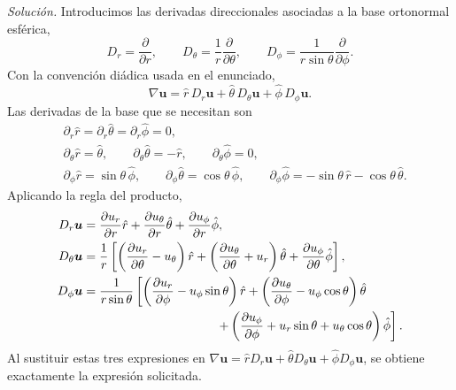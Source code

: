 \documentclass[12pt]{article}
\begin{document}
\textit{Solución.} Introducimos las derivadas direccionales asociadas a la base ortonormal esférica,
\begin{equation}
D_r=\frac{\partial}{\partial r},\qquad
D_\theta=\frac1r\frac{\partial}{\partial\theta},\qquad
D_\phi=\frac{1}{r\sin\theta}\frac{\partial}{\partial\phi}.
\end{equation}
Con la convención diádica usada en el enunciado,
\begin{equation}
\nabla\bm u=\hat r\,D_r\bm u+\hat\theta\,D_\theta\bm u+\hat\phi\,D_\phi\bm u.
\end{equation}
Las derivadas de la base que se necesitan son
\begin{align}
&\partial_r\hat r=\partial_r\hat\theta=\partial_r\hat\phi=0,\\
&\partial_\theta\hat r=\hat\theta,\qquad
\partial_\theta\hat\theta=-\hat r,\qquad
\partial_\theta\hat\phi=0,\\
&\partial_\phi\hat r=\sin\theta\,\hat\phi,\qquad
\partial_\phi\hat\theta=\cos\theta\,\hat\phi,\qquad
\partial_\phi\hat\phi=-\sin\theta\,\hat r-\cos\theta\,\hat\theta.
\end{align}
Aplicando la regla del producto,
\begin{align}
D_r\bm u={}&
\frac{\partial u_r}{\partial r}\hat r
+\frac{\partial u_\theta}{\partial r}\hat\theta
+\frac{\partial u_\phi}{\partial r}\hat\phi,\\
D_\theta\bm u={}&\frac1r\left[
\left(\frac{\partial u_r}{\partial\theta}-u_\theta\right)\hat r
+\left(\frac{\partial u_\theta}{\partial\theta}+u_r\right)\hat\theta
+\frac{\partial u_\phi}{\partial\theta}\hat\phi\right],\\
D_\phi\bm u={}&\frac{1}{r\sin\theta}\left[
\left(\frac{\partial u_r}{\partial\phi}-u_\phi\sin\theta\right)\hat r
+\left(\frac{\partial u_\theta}{\partial\phi}-u_\phi\cos\theta\right)\hat\theta\right.\\
&\left.\hspace{3.3cm}+\left(\frac{\partial u_\phi}{\partial\phi}+u_r\sin\theta+u_\theta\cos\theta\right)\hat\phi\right].
\end{align}
Al sustituir estas tres expresiones en $\nabla\bm u=\hat r D_r\bm u+\hat\theta D_\theta\bm u+\hat\phi D_\phi\bm u$, se obtiene exactamente la expresión solicitada.
\end{document}
